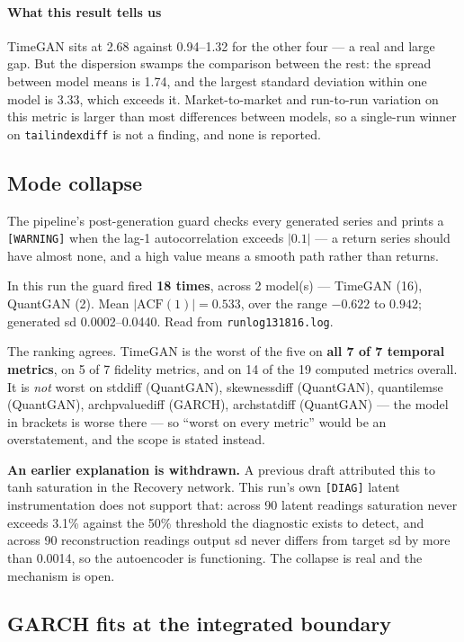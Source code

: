 \documentclass[11pt,a4paper]{article}
\makeatletter
\DeclareRobustCommand{\_}{\ifmmode\nfss@text{\textunderscore}\else\textunderscore\allowbreak\fi}
\makeatother
\begin{document}
\paragraph{What this result tells us} TimeGAN sits at 2.68 against 0.94--1.32 for the other four --- a real and large gap. But the dispersion swamps the comparison between the rest: the spread between model means is 1.74, and the largest standard deviation within one model is 3.33, which exceeds it. Market-to-market and run-to-run variation on this metric is larger than most differences between models, so a single-run winner on \texttt{tail\_index\_diff} is not a finding, and none is reported.

\subsection{Mode collapse}
\label{sec:collapse}
The pipeline's post-generation guard checks every generated series and prints a \texttt{[WARNING]} when the lag-1 autocorrelation exceeds $|0.1|$ --- a return series should have almost none, and a high value means a smooth path rather than returns.

In this run the guard fired \textbf{18 times}, across 2 model(s) --- TimeGAN (16), QuantGAN (2). Mean \(|\text{ACF}(1)| = 0.533\), over the range \(-0.622\) to \(0.942\); generated sd 0.0002--0.0440. Read from \texttt{run\_log\_20260912\_131816.log}.

The ranking agrees. TimeGAN is the worst of the five on \textbf{all 7 of 7 temporal metrics}, on 5 of 7 fidelity metrics, and on 14 of the 19 computed metrics overall. It is \emph{not} worst on std\_diff (QuantGAN), skewness\_diff (QuantGAN), quantile\_mse (QuantGAN), arch\_pvalue\_diff (GARCH), arch\_stat\_diff (QuantGAN) --- the model in brackets is worse there --- so ``worst on every metric'' would be an overstatement, and the scope is stated instead.

\textbf{An earlier explanation is withdrawn.} A previous draft attributed this to tanh saturation in the Recovery network. This run's own \texttt{[DIAG]} latent instrumentation does not support that: across 90 latent readings saturation never exceeds 3.1\% against the 50\% threshold the diagnostic exists to detect, and across 90 reconstruction readings output sd never differs from target sd by more than 0.0014, so the autoencoder is functioning. The collapse is real and the mechanism is open.

\subsection{GARCH fits at the integrated boundary}
\label{sec:boundary}
\end{document}
